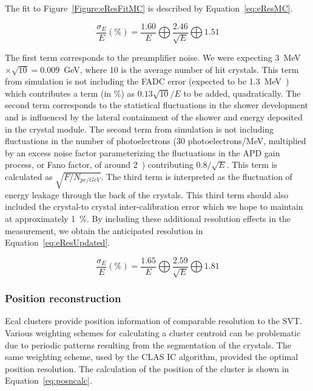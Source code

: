 The fit to Figure~\ref{Figure:eResFitMC} is described by Equation~\ref{eq:eResMC}.

\begin{equation}
\label{eq:eResMC}
\dfrac{\sigma_E}{E} (\%) = \dfrac{1.60}{E} \bigoplus \dfrac{2.46}{\sqrt{E}} \bigoplus 1.51 
\end{equation}

The first term corresponds to the preamplifier noise. We were expecting 3~MeV$\times \sqrt{10} = 0.009$~GeV, where 10 is the average number of hit crystals. This term from simulation is not including the FADC error (expected to be 1.3~MeV~\cite{Charles}) which contributes a term (in $\%$) as $0.13\sqrt{10}/E$ to be added, quadratically. The second term corresponds to the statistical fluctuations in the shower development and is influenced by the lateral containment of the shower and energy deposited in the crystal module. The second term from simulation is not including fluctuations in the number of photoelectrons (30 photoelectrons/MeV, multiplied by an excess noise factor parameterizing the fluctuations in the APD gain process, or Fano factor, of around 2~\cite{panda}) contributing $0.8/\sqrt{E}$. This term is calculated as $\sqrt{F/N_{pe/GeV}}$. The third term is interpreted as the fluctuation of energy leakage through the back of the crystals. This third term should also included the crystal-to crystal inter-calibration error which we hope to maintain at approximately 1~$\%$. By including these additional resolution effects in the measurement, we obtain the anticipated resolution in Equation~\eqref{eq:eResUpdated}.

\begin{equation}
\label{eq:eResUpdated}
\dfrac{\sigma_E}{E} (\%) = \dfrac{1.65}{E} \bigoplus \dfrac{2.59}{\sqrt{E}} \bigoplus 1.81 
\end{equation}

\subsubsection{Position reconstruction}
\indent Ecal clusters provide position information of comparable resolution to the SVT. Various weighting schemes for calculating a cluster centroid can be problematic due to periodic patterns resulting from the segmentation of the crystals. The same weighting scheme, used by the CLAS IC algorithm, provided the optimal position resolution. The calculation of the position of the cluster is shown in Equation~\eqref{eq:posncalc}.

